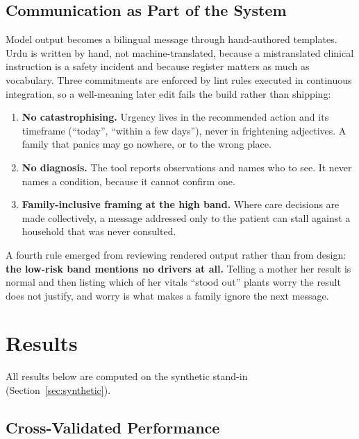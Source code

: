 \documentclass[journal]{IEEEtran}
\begin{document}
\subsection{Communication as Part of the System}
\label{sec:communication}

Model output becomes a bilingual message through hand-authored templates. Urdu
is written by hand, not machine-translated, because a mistranslated clinical
instruction is a safety incident and because register matters as much as
vocabulary. Three commitments are enforced by lint rules executed in continuous
integration, so a well-meaning later edit fails the build rather than shipping:

\begin{enumerate}
\item \textbf{No catastrophising.} Urgency lives in the recommended action and
its timeframe (``today'', ``within a few days''), never in frightening
adjectives. A family that panics may go nowhere, or to the wrong place.
\item \textbf{No diagnosis.} The tool reports observations and names who to see.
It never names a condition, because it cannot confirm one.
\item \textbf{Family-inclusive framing at the high band.} Where care decisions
are made collectively, a message addressed only to the patient can stall against
a household that was never consulted.
\end{enumerate}

A fourth rule emerged from reviewing rendered output rather than from design:
\textbf{the low-risk band mentions no drivers at all.} Telling a mother her
result is normal and then listing which of her vitals ``stood out'' plants worry
the result does not justify, and worry is what makes a family ignore the next
message.

\section{Results}
\label{sec:results}

All results below are computed on the synthetic stand-in
(Section~\ref{sec:synthetic}).

\subsection{Cross-Validated Performance}
\label{sec:cv-results}
\end{document}
